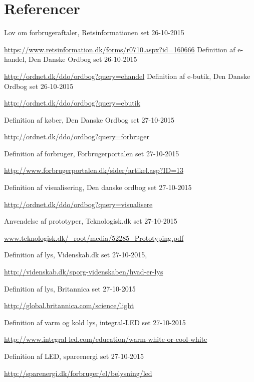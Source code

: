 \section{Referencer}

\begin{thebibliography}{99}
  Lov om forbrugeraftaler,
  Retsinformationen
  set 26-10-2015
  
  \url{https://www.retsinformation.dk/forms/r0710.aspx?id=160666}
  Definition af e-handel,
  Den Danske Ordbog
  set 26-10-2015
  
  \url{http://ordnet.dk/ddo/ordbog?query=ehandel}
  Definition af e-butik,
  Den Danske Ordbog
  set 26-10-2015
  
  \url{http://ordnet.dk/ddo/ordbog?query=ebutik}

  Definition af køber,
  Den Danske Ordbog
  set 27-10-2015
  
  \url{http://ordnet.dk/ddo/ordbog?query=forbruger}

  Definition af forbruger,
  Forbrugerportalen
  set 27-10-2015
  
  \url{http://www.forbrugerportalen.dk/sider/artikel.asp?ID=13}

  Definition af visualisering,
  Den danske ordbog
  set 27-10-2015
  
  \url{http://ordnet.dk/ddo/ordbog?query=visualisere}

  Anvendelse af prototyper,
  Teknologisk.dk
  set 27-10-2015
  
  \url{www.teknologisk.dk/_root/media/52285_Prototyping.pdf}

  Definition af lys,
  Videnskab.dk
  set 27-10-2015,
  
  \url{http://videnskab.dk/sporg-videnskaben/hvad-er-lys}

  Definition af lys,
  Britannica
  set 27-10-2015
  
  \url{http://global.britannica.com/science/light}

  Definition af varm og kold lys,
  integral-LED
  set 27-10-2015
  
  \url{http://www.integral-led.com/education/warm-white-or-cool-white}

  Definition af LED,
  spareenergi
  set 27-10-2015
  
  \url{http://sparenergi.dk/forbruger/el/belysning/led}


\end{thebibliography}
